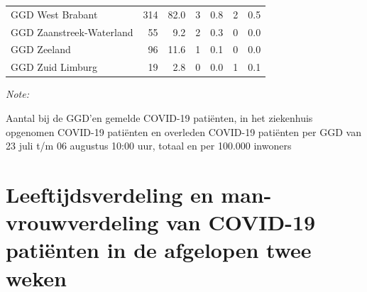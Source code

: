 \documentclass[
  english,
  man,floatsintext]{apa6}
\begin{document}
\begin{table}[H]
\begin{threeparttable}
\begin{tabular}{lrrrrrr}
GGD West Brabant & 314 & 82.0 & 3 & 0.8 & 2 & 0.5\\
GGD Zaanstreek-Waterland & 55 & 9.2 & 2 & 0.3 & 0 & 0.0\\
GGD Zeeland & 96 & 11.6 & 1 & 0.1 & 0 & 0.0\\
GGD Zuid Limburg & 19 & 2.8 & 0 & 0.0 & 1 & 0.1\\
\bottomrule
\end{tabular}
\begin{tablenotes}
\item \textit{Note: } 
\item Aantal bij de GGD’en gemelde COVID-19 patiënten, in het ziekenhuis opgenomen COVID-19 patiënten en overleden COVID-19 patiënten per GGD van 23 juli t/m 06 augustus 10:00 uur, totaal en per 100.000 inwoners
\end{tablenotes}
\end{threeparttable}
\endgroup{}
\end{table}

\newpage

\hypertarget{leeftijdsverdeling-en-man-vrouwverdeling-van-covid-19-patiuxebnten-in-de-afgelopen-twee-weken}{%
\section{Leeftijdsverdeling en man-vrouwverdeling van COVID-19 patiënten in de afgelopen twee weken}\label{leeftijdsverdeling-en-man-vrouwverdeling-van-covid-19-patiuxebnten-in-de-afgelopen-twee-weken}}
\end{document}
